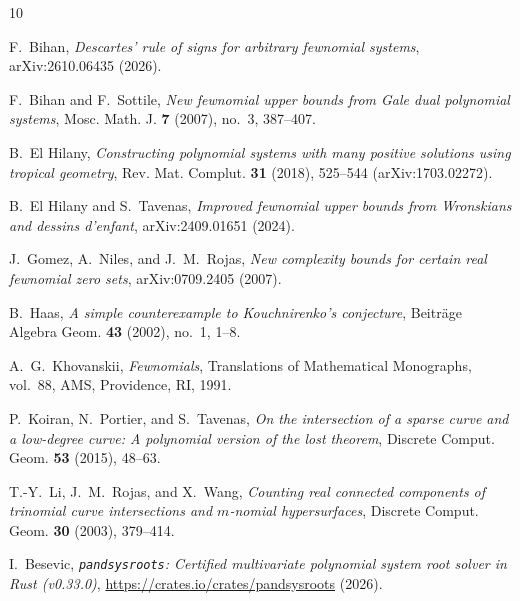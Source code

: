 \documentclass[11pt,a4paper]{amsart}
\theoremstyle{remark}
\begin{document}
\begin{thebibliography}{10}

F.~Bihan,
\emph{Descartes' rule of signs for arbitrary fewnomial systems},
arXiv:2610.06435 (2026).

F.~Bihan and F.~Sottile,
\emph{New fewnomial upper bounds from Gale dual polynomial systems},
Mosc. Math. J. \textbf{7} (2007), no.~3, 387--407.

B.~El Hilany,
\emph{Constructing polynomial systems with many positive solutions using tropical geometry},
Rev. Mat. Complut. \textbf{31} (2018), 525--544 (arXiv:1703.02272).

B.~El Hilany and S.~Tavenas,
\emph{Improved fewnomial upper bounds from Wronskians and dessins d'enfant},
arXiv:2409.01651 (2024).

J.~Gomez, A.~Niles, and J.~M.~Rojas,
\emph{New complexity bounds for certain real fewnomial zero sets},
arXiv:0709.2405 (2007).

B.~Haas,
\emph{A simple counterexample to Kouchnirenko's conjecture},
Beitr\"age Algebra Geom. \textbf{43} (2002), no.~1, 1--8.

A.~G.~Khovanskii,
\emph{Fewnomials},
Translations of Mathematical Monographs, vol.~88, AMS, Providence, RI, 1991.

P.~Koiran, N.~Portier, and S.~Tavenas,
\emph{On the intersection of a sparse curve and a low-degree curve: A polynomial version of the lost theorem},
Discrete Comput. Geom. \textbf{53} (2015), 48--63.

T.-Y.~Li, J.~M.~Rojas, and X.~Wang,
\emph{Counting real connected components of trinomial curve intersections and $m$-nomial hypersurfaces},
Discrete Comput. Geom. \textbf{30} (2003), 379--414.

I.~Besevic,
\emph{\texttt{pandsysroots}: Certified multivariate polynomial system root solver in Rust (v0.33.0)},
\url{https://crates.io/crates/pandsysroots} (2026).

\end{thebibliography}
\end{document}
